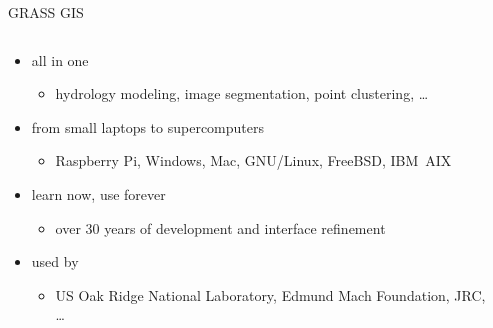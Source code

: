 \documentclass[xcolor={dvipsnames,usenames},beamer,aspectratio=43]{beamer}
\begin{document}
\begin{frame}{GRASS GIS}

\begin{columns}
\begin{column}{0.6\textwidth}

\begin{itemize}
  \item all in one
  \begin{itemize}
   \item hydrology modeling, image segmentation, point clustering, \ldots
  \end{itemize}
  \item from small laptops to supercomputers
  \begin{itemize}
   \item Raspberry Pi, Windows, Mac, GNU/Linux, FreeBSD, IBM~AIX
  \end{itemize}
  \item learn now, use forever
  \begin{itemize}
    \item over 30 years of development and interface refinement
  \end{itemize}
  \item used by
  \begin{itemize}
    \item US Oak Ridge National Laboratory, Edmund Mach Foundation, JRC, \ldots
  \end{itemize}
\end{itemize}

\end{column}
\begin{column}{0.3\textwidth}


\end{column}
\end{columns}
\end{frame}
\end{document}
